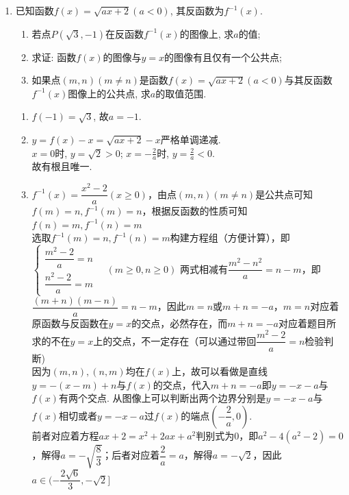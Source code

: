 \begin{enumerate}
\begin{jieda}
\end{jieda}


\item 已知函数$f(x)=\sqrt{ax+2}(a<0)$, 其反函数为$f^{-1}(x)$. 
\begin{enumerate}[(1)]
\item 若点$P(\sqrt{3},-1)$在反函数$f^{-1}(x)$的图像上, 求$a$的值; 
\item 求证: 函数$f(x)$的图像与$y=x$的图像有且仅有一个公共点; 
\item 如果点$(m,n)(m\neq n)$是函数$f(x)=\sqrt{ax+2}(a<0)$与其反函数$f^{-1}(x)$图像上的公共点, 求$a$的取值范围.
\end{enumerate}
\begin{jieda}
\begin{enumerate}[(1)]
\item $f(-1)=\sqrt{3}$, 故$a=-1$. 

\item $y=f(x)-x=\sqrt{ax+2}-x$严格单调递减. \\
$x=0$时, $y=\sqrt{2}>0$; $x=-\frac{2}{a}$时, $y=\frac{2}{a}<0$. \\
故有根且唯一. 

\item 
    $f^{-1}(x) = \dfrac{x^2-2}{a} (x \geq 0)$，由点$(m, n) (m \neq n)$是公共点可知$f(m) = n, f^{-1}(m) = n$，根据反函数的性质可知$f(n) = m, f^{-1}(n) = m$ \\
        选取$f^{-1}(m) = n, f^{-1}(n) = m$构建方程组（方便计算），即$\left \{ \begin{array}{ll}
             \dfrac{m^2-2}{a} = n  \\
             \dfrac{n^2-2}{a} = m
        \end{array}\right. \quad (m \geq 0, n \geq 0)$
        两式相减有$\dfrac{m^2-n^2}{a} = n-m$，即$\dfrac{(m+n)(m-n)}{a} = n-m$，因此$m = n$或$m+n = -a$，$m = n$对应着原函数与反函数在$y = x$的交点，必然存在，而$m+n = -a$对应着题目所求的不在$y = x$上的交点，不一定存在（可以通过带回$\dfrac{m^2-2}{a} = n$检验判断) \\
        因为$(m, n), (n, m)$均在$f(x)$上，故可以看做是直线$y = -(x-m)+n$与$f(x)$的交点，代入$m+n = -a$即$y = -x-a$与$f(x)$有两个交点. 从图像上可以判断出两个边界分别是$y = -x-a$与$f(x)$相切或者$y = -x-a$过$f(x)$的端点$(-\dfrac{2}{a}, 0)$. \\
        前者对应着方程$ax+2 = x^2+2ax+a^2$判别式为0，即$a^2-4(a^2-2)= 0$，解得$a = -\sqrt{\dfrac{8}{3}}$；后者对应着$\dfrac{2}{a} = a$，解得$a = -\sqrt{2}$，因此$a \in (-\dfrac{2\sqrt{6}}{3}, -\sqrt{2}]$
\end{enumerate}
\end{jieda}


\end{enumerate}




